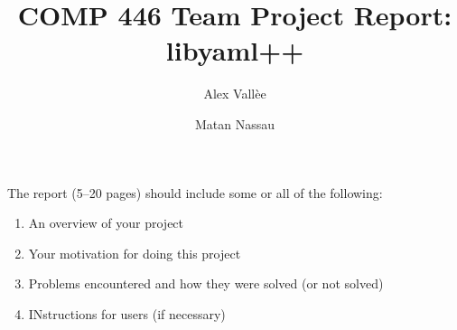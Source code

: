 \documentclass{article}
\author{Alex Vall\`ee \and Matan Nassau}
\title{COMP 446 Team Project Report:  libyaml++}
\begin{document}
\maketitle
The report (5--20 pages) should include some or all of the following:
\begin{enumerate}
  \item An overview of your project
  \item Your motivation for doing this project
  \item Problems encountered and how they were solved (or not solved)
  \item INstructions for users (if necessary)
\end{enumerate}
\end{document}
